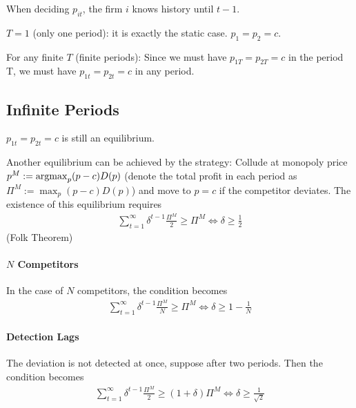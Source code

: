 \documentclass[11pt]{elegantbook_2}
\newcommand{\argmax}{\operatornamewithlimits{argmax}}
\begin{document}
When deciding $p_{it}$, the firm $i$ knows history until $t-1$.

$T=1$ (only one period): it is exactly the static case. $p_1=p_2=c$.

For any finite $T$ (finite periods): Since we must have $p_{1T}=p_{2T}=c$ in the period T, we must have $p_{1t}=p_{2t}=c$ in any period.

\subsection{Infinite Periods}
$p_{1t}=p_{2t}=c$ is still an equilibrium.

Another equilibrium can be achieved by the strategy: Collude at monopoly price $p^M:=\argmax_{p}(p-c)D(p)$ (denote the total profit in each period as $\Pi^M:=\max_{p}(p-c)D(p)$) and move to $p=c$ if the competitor deviates. The existence of this equilibrium requires
\begin{equation}
    \begin{aligned}
        \sum_{t=1}^\infty\delta^{t-1}\frac{\Pi^M}{2}\geq \Pi^M
        \Leftrightarrow \delta\geq \frac{1}{2}
    \end{aligned}
    \nonumber
\end{equation}
(Folk Theorem)

\paragraph*{$N$ Competitors}
In the case of $N$ competitors, the condition becomes
\begin{equation}
    \begin{aligned}
        \sum_{t=1}^\infty\delta^{t-1}\frac{\Pi^M}{N}\geq \Pi^M
        \Leftrightarrow \delta\geq 1-\frac{1}{N}
    \end{aligned}
    \nonumber
\end{equation}

\paragraph*{Detection Lags}
The deviation is not detected at once, suppose after two periods. Then the condition becomes
\begin{equation}
    \begin{aligned}
        \sum_{t=1}^\infty\delta^{t-1}\frac{\Pi^M}{2}\geq (1+\delta)\Pi^M
        \Leftrightarrow \delta\geq \frac{1}{\sqrt{2}}
    \end{aligned}
    \nonumber
\end{equation}
\end{document}
